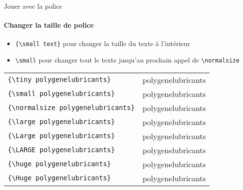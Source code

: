 \begin{frame}[fragile]{Jouer avec la police}
  \framesubtitle{Changer la taille de police}
  \begin{itemize}
      \item \lstinline|{\small text}| pour changer la taille du texte à l'intérieur
      \item \lstinline|\small| pour changer tout le texte jusqu'au prochain appel de \lstinline|\normalsize|
  \end{itemize}
  \begin{tabular}{ll}
  \lstinline|{\tiny polygenelubricants}| & {\tiny polygenelubricants} \\
  \lstinline|{\small polygenelubricants}| & {\small polygenelubricants} \\
  \lstinline|{\normalsize polygenelubricants}| & {\normalsize polygenelubricants} \\
  \lstinline|{\large polygenelubricants}| & {\large polygenelubricants} \\
  \lstinline|{\Large polygenelubricants}| & {\Large polygenelubricants} \\
  \lstinline|{\LARGE polygenelubricants}| & {\LARGE polygenelubricants} \\
  \lstinline|{\huge polygenelubricants}| & {\huge polygenelubricants} \\
  \lstinline|{\Huge polygenelubricants}| & {\Huge polygenelubricants} \\
  \end{tabular}
\end{frame}
